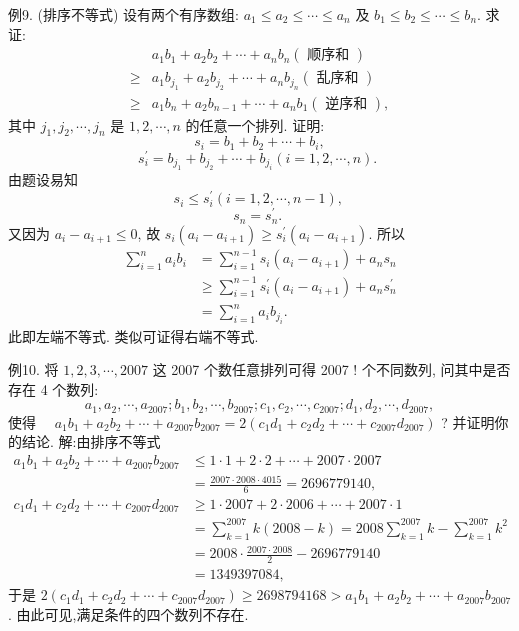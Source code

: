 例9. (排序不等式) 设有两个有序数组: $a_1 \leqslant a_2 \leqslant \cdots \leqslant a_n$ 及 $b_1 \leqslant b_2 \leqslant \cdots \leqslant b_n$. 求证:
$$
\begin{aligned}
& a_1 b_1+a_2 b_2+\cdots+a_n b_n(\text { 顺序和 }) \\
\geqslant & a_1 b_{j_1}+a_2 b_{j_2}+\cdots+a_n b_{j_n}(\text { 乱序和 }) \\
\geqslant & a_1 b_n+a_2 b_{n-1}+\cdots+a_n b_1(\text { 逆序和 }),
\end{aligned}
$$
其中 $j_1, j_2, \cdots, j_n$ 是 $1,2, \cdots, n$ 的任意一个排列.
证明:$$
s_i=b_1+b_2+\cdots+b_i,
$$
$$
s_i^{\prime}=b_{j_1}+b_{j_2}+\cdots+b_{j_i}(i=1,2, \cdots, n) \text {. }
$$
由题设易知
$$
s_i \leqslant s_i^{\prime}(i=1,2, \cdots, n-1) \text {, }
$$
$$
s_n=s_n^{\prime} \text {. }
$$
又因为 $a_i-a_{i+1} \leqslant 0$, 故 $s_i\left(a_i-a_{i+1}\right) \geqslant s_i^{\prime}\left(a_i-a_{i+1}\right)$.
所以
$$
\begin{aligned}
\sum_{i=1}^n a_i b_i & =\sum_{i=1}^{n-1} s_i\left(a_i-a_{i+1}\right)+a_n s_n \\
& \geqslant \sum_{i=1}^{n-1} s_i^{\prime}\left(a_i-a_{i+1}\right)+a_n s_n^{\prime} \\
& =\sum_{i=1}^n a_i b_{j_i} .
\end{aligned}
$$
此即左端不等式.
类似可证得右端不等式.



例10. 将 $1,2,3, \cdots, 2007$ 这 2007 个数任意排列可得 2007 ! 个不同数列, 问其中是否存在 4 个数列:
$$
a_1, a_2, \cdots, a_{2007} ; b_1, b_2, \cdots, b_{2007} ; c_1, c_2, \cdots, c_{2007} ; d_1, d_2, \cdots, d_{2007},
$$
使得 $\quad a_1 b_1+a_2 b_2+\cdots+a_{2007} b_{2007}=2\left(c_1 d_1+c_2 d_2+\cdots+c_{2007} d_{2007}\right)$ ?
并证明你的结论.
解:由排序不等式
$$
\begin{aligned}
a_1 b_1+a_2 b_2+\cdots+a_{2007} b_{2007} & \leqslant 1 \cdot 1+2 \cdot 2+\cdots+2007 \cdot 2007 \\
& =\frac{2007 \cdot 2008 \cdot 4015}{6}=2696779140, \\
c_1 d_1+c_2 d_2+\cdots+c_{2007} d_{2007} & \geqslant 1 \cdot 2007+2 \cdot 2006+\cdots+2007 \cdot 1 \\
& =\sum_{k=1}^{2007} k(2008-k)=2008 \sum_{k=1}^{2007} k-\sum_{k=1}^{2007} k^2 \\
& =2008 \cdot \frac{2007 \cdot 2008}{2}-2696779140 \\
& =1349397084,
\end{aligned}
$$
于是 $2\left(c_1 d_1+c_2 d_2+\cdots+c_{2007} d_{2007}\right) \geqslant 2698794168>a_1 b_1+a_2 b_2+\cdots+ a_{2007} b_{2007}$.
由此可见,满足条件的四个数列不存在.



